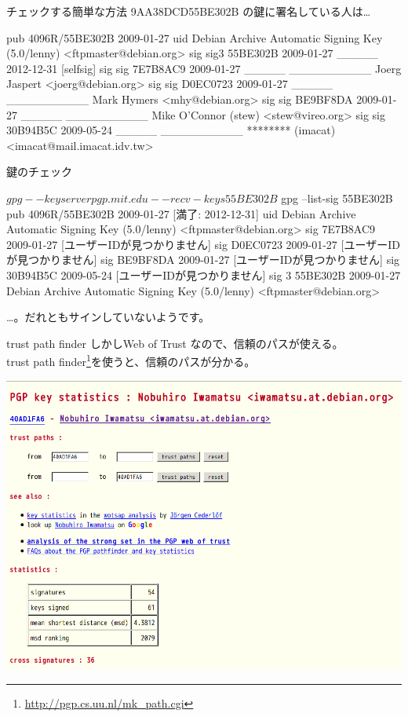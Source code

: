 \begin{frame}[containsverbatim]{チェックする簡単な方法}
9AA38DCD55BE302B の鍵に署名している人は…
\begin{commandline}
pub  4096R/55BE302B 2009-01-27            
uid Debian Archive Automatic Signing Key (5.0/lenny) <ftpmaster@debian.org>
sig  sig3  55BE302B 2009-01-27 _____ 2012-12-31 [selfsig]
sig  sig   7E7B8AC9 2009-01-27 _____ __________ Joerg Jaspert <joerg@debian.org>
sig  sig   D0EC0723 2009-01-27 _____ __________ Mark Hymers <mhy@debian.org>
sig  sig   BE9BF8DA 2009-01-27 _____ __________ Mike O'Connor (stew) <stew@vireo.org>
sig  sig   30B94B5C 2009-05-24 _____ __________ ******** (imacat) <imacat@mail.imacat.idv.tw>
\end{commandline}
鍵のチェック
\begin{commandline}
$ gpg --keyserver pgp.mit.edu --recv-keys 55BE302B
$ gpg --list-sig 55BE302B
pub   4096R/55BE302B 2009-01-27 [満了: 2012-12-31]
uid                  Debian Archive Automatic Signing Key (5.0/lenny)
<ftpmaster@debian.org>
sig          7E7B8AC9 2009-01-27  [ユーザーIDが見つかりません]
sig          D0EC0723 2009-01-27  [ユーザーIDが見つかりません]
sig          BE9BF8DA 2009-01-27  [ユーザーIDが見つかりません]
sig          30B94B5C 2009-05-24  [ユーザーIDが見つかりません]
sig 3        55BE302B 2009-01-27  Debian Archive Automatic Signing Key (5.0/lenny) <ftpmaster@debian.org>
\end{commandline}
…。だれともサインしていないようです。
\end{frame}


\begin{frame}[containsverbatim]{trust path finder}
しかしWeb of Trust なので、信頼のパスが使える。\\
trust path finder\footnote{\url{http://pgp.cs.uu.nl/mk_path.cgi}}を使うと、信頼のパスが分かる。\\
\begin{center}
\includegraphics[width=0.8\hsize]{image200909/trust-path.png}
\end{center}
\end{frame}

